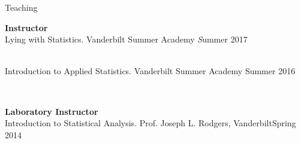 \begin{rSection}{\textrm{Teaching}}
\vspace*{2pt}
\begin{minipage}{\linewidth}{\large {\bf Instructor}\\}
Lying with Statistics. Vanderbilt Summer Academy \hfill{\textit Summer 2017}%
\begin{comment}
\begin{quote}\small ....
\end{quote}
\end{comment}
\smallskip\\
Introduction to Applied Statistics. Vanderbilt Summer Academy \hfill{Summer 2016}%
\begin{comment}\begin{quote}\small Course Description: Media stories about ``the latest scientific findings'' can range from the plausible to the silly. This class will help you learn to separate truth from  fiction by introducing you to the basic statistical methods and tools used in psychological  research. You will learn to use \R, a free and powerful statistical software package, to conduct and interpret basic scientific statistical tests. You will begin to recognize the difference between proper and improper use of data, especially the distinction between correlation and causation (\textit{e.g.}, why margarine consumption does not actually lead to more divorces in the state of Maine). For the final project, you will formulate and answer your own scientific question using these new tools and real psychology data.
\end{quote}\end{comment}
\end{minipage}
\smallskip\\
\begin{minipage}{\linewidth}{\large {\bf Laboratory Instructor}\\}
Introduction to Statistical Analysis. Prof. Joseph L. Rodgers, Vanderbilt\hfill  {Spring 2014}%

\end{minipage}
\end{rSection}
